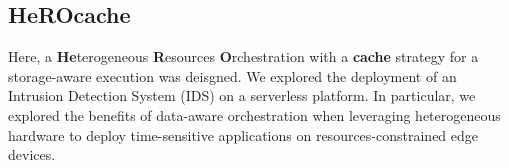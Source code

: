 







\subsection{HeROcache}


Here, a \textbf{He}terogeneous \textbf{R}esources \textbf{O}rchestration with a \textbf{cache} strategy for a storage-aware execution was deisgned. We explored the deployment of an Intrusion Detection System (IDS) on a serverless platform. In particular, we explored the benefits of data-aware orchestration when leveraging heterogeneous hardware to deploy time-sensitive applications on resources-constrained edge devices.%



